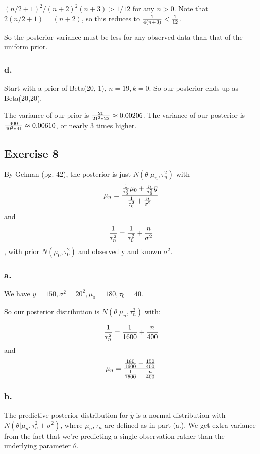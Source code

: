 \documentclass{article}
\begin{document}
\({(n/2 + 1)^2 / (n + 2)^2 (n+3)} > 1/12\) for any \(n > 0\). Note that \( 2(n/2 + 1) = (n + 2)\), so this
reduces to \({1 \over 4(n+3)} < {1 \over 12}\).

So the posterior variance must be less for any observed data than that of the uniform prior.

\subsubsection{d.}

Start with a prior of Beta(20, 1), \(n = 19, k=0\). So our posterior ends up as Beta(20,20).

The variance of our prior is \({20 \over 21^2 * 22} \approx 0.00206\). The variance of our
posterior is \({400 \over 40^2*41} \approx 0.00610\), or nearly 3 times higher.


\subsection{Exercise 8}

By Gelman (pg. 42), the posterior is just \(N(\theta \vert \mu_n, \tau_n^2)\)
with \[\mu_n = {{{1 \over \tau_0^2}\mu_0 + {n \over \sigma_0^2}\bar{y}} \over { {1 \over \tau_0^2} + {n \over \sigma^2}}}\]
and \[{ 1 \over \tau^2_n} = {{1 \over \tau_0^2} + {n \over \sigma^2}}\],
with prior \(N(\mu_0, \tau_0^2)\) and observed y and known \(\sigma^2\).

\subsubsection{a.}

We have \(\bar{y} = 150, \sigma^2 = 20^2, \mu_0 = 180, \tau_0 = 40\).

So our posterior distribution is \(N(\theta \vert \mu_n, \tau_n^2)\)
with:

\[{ 1 \over \tau^2_n}= {{1 \over 1600} + {n \over 400}}\] and 
\[\mu_n = {{{180 \over 1600} + {150 \over 400}} \over {{1 \over 1600} + {n \over 400}}}\]


\subsubsection{b.}

The predictive posterior distribution for \(\tilde{y}\) is a normal distribution
with  \(N(\theta \vert \mu_n, \tau_n^2 + \sigma^2)\), where \(\mu_n, \tau_n\) are
defined as in part (a.). We get extra variance from the fact that we're
predicting a single observation rather than the underlying parameter \(\theta\).
\end{document}
